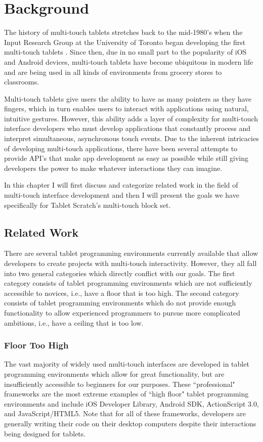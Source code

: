 \chapter{Background}
The history of multi-touch tablets stretches back to the mid-1980's when the Input Research Group at the University of Toronto began developing the first multi-touch tablets \cite{LBS, Mehta}. Since then, due in no small part to the popularity of iOS and Android devices, multi-touch tablets have become ubiquitous in modern life and are being used in all kinds of environments from grocery stores to classrooms.

Multi-touch tablets give users the ability to have as many pointers as they have fingers, which in turn enables users to interact with applications using natural, intuitive gestures. However, this ability adds a layer of complexity for multi-touch interface developers who must develop applications that constantly process and interpret simultaneous, asynchronous touch events. Due to the inherent intricacies of developing multi-touch applications, there have been several attempts to provide API's that make app development as easy as possible while still giving developers the power to make whatever interactions they can imagine.

In this chapter I will first discuss and categorize related work in the field of multi-touch interface development and then I will present the goals we have specifically for Tablet Scratch's multi-touch block set.
 
\section{Related Work}
There are several tablet programming environments currently available that allow developers to create projects with multi-touch interactivity. However, they all fall into two general categories which directly conflict with our goals. The first category consists of tablet programming environments which are not sufficiently accessible to novices, i.e., have a floor that is too high. The second category consists of tablet programming environments which do not provide enough functionality to allow experienced programmers to pursue more complicated ambitions, i.e., have a ceiling that is too low. 

\subsection{Floor Too High}
The vast majority of widely used multi-touch interfaces are developed in tablet programming environments which allow for great functionality, but are insufficiently accessible to beginners for our purposes. These ``professional" frameworks are the most extreme examples of ``high floor" tablet programming environments and include iOS Developer Library\cite{iOS}, Android SDK\cite{Android}, ActionScript 3.0\cite{ActionScript}, and JavaScript/HTML5\cite{JavaScript}. Note that for all of these frameworks, developers are generally writing their code on their desktop computers despite their interactions being designed for tablets.

